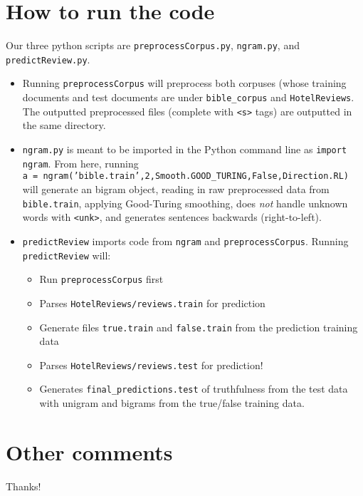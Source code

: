 \documentclass{article}
\begin{document}
\section{How to run the code}
Our three python scripts are \texttt{preprocessCorpus.py}, \texttt{ngram.py}, and \texttt{predictReview.py}.\par
\begin{itemize}[noitemsep]
\item Running \texttt{preprocessCorpus} will preprocess both corpuses (whose training documents and test documents are under \texttt{bible\_corpus} and \texttt{HotelReviews}. The outputted preprocessed files (complete with \texttt{<s>} tags) are outputted in the same directory.
\item \texttt{ngram.py} is meant to be imported in the Python command line as \texttt{import ngram}. From here, running\\
\texttt{a = ngram('bible.train',2,Smooth.GOOD\_TURING,False,Direction.RL)}\\
will generate an bigram object, reading in raw preprocessed data from \texttt{bible.train}, applying Good-Turing smoothing, does \emph{not} handle unknown words with \texttt{<unk>}, and generates sentences backwards (right-to-left).
\item \texttt{predictReview} imports code from \texttt{ngram} and \texttt{preprocessCorpus}. Running \texttt{predictReview} will:
\begin{itemize}[noitemsep,nolistsep]
\item Run \texttt{preprocessCorpus} first
\item Parses \texttt{HotelReviews/reviews.train} for prediction
\item Generate files \texttt{true.train} and \texttt{false.train} from the prediction training data
\item Parses \texttt{HotelReviews/reviews.test} for prediction!
\item Generates \texttt{final\_predictions.test} of truthfulness from the test data with unigram and bigrams from the true/false training data.
\end{itemize}
\end{itemize}

\section{Other comments}
Thanks!
\end{document}
